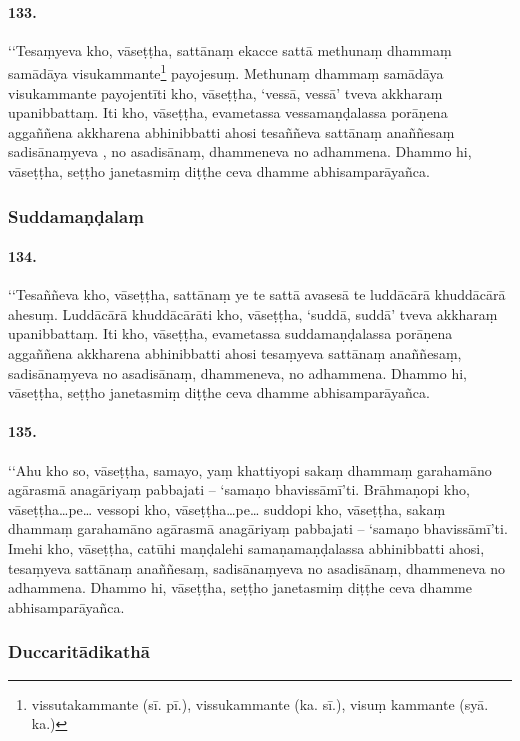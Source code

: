 \paragraph{133.} ‘‘Tesaṃyeva kho, vāseṭṭha, sattānaṃ ekacce sattā methunaṃ dhammaṃ samādāya visukammante\footnote{vissutakammante (sī. pī.), vissukammante (ka. sī.), visuṃ kammante (syā. ka.)} payojesuṃ. Methunaṃ dhammaṃ samādāya visukammante payojentīti kho, vāseṭṭha, ‘vessā, vessā’ tveva akkharaṃ upanibbattaṃ. Iti kho, vāseṭṭha, evametassa vessamaṇḍalassa porāṇena aggaññena akkharena abhinibbatti ahosi tesaññeva sattānaṃ anaññesaṃ sadisānaṃyeva , no asadisānaṃ, dhammeneva no adhammena. Dhammo hi, vāseṭṭha, seṭṭho janetasmiṃ diṭṭhe ceva dhamme abhisamparāyañca.

\subsubsection{Suddamaṇḍalaṃ}

\paragraph{134.} ‘‘Tesaññeva kho, vāseṭṭha, sattānaṃ ye te sattā avasesā te luddācārā khuddācārā ahesuṃ. Luddācārā khuddācārāti kho, vāseṭṭha, ‘suddā, suddā’ tveva akkharaṃ upanibbattaṃ. Iti kho, vāseṭṭha, evametassa suddamaṇḍalassa porāṇena aggaññena akkharena abhinibbatti ahosi tesaṃyeva sattānaṃ anaññesaṃ, sadisānaṃyeva no asadisānaṃ, dhammeneva, no adhammena. Dhammo hi, vāseṭṭha, seṭṭho janetasmiṃ diṭṭhe ceva dhamme abhisamparāyañca.

\paragraph{135.} ‘‘Ahu kho so, vāseṭṭha, samayo, yaṃ khattiyopi sakaṃ dhammaṃ garahamāno agārasmā anagāriyaṃ pabbajati – ‘samaṇo bhavissāmī’ti. Brāhmaṇopi kho, vāseṭṭha…pe… vessopi kho, vāseṭṭha…pe… suddopi kho, vāseṭṭha, sakaṃ dhammaṃ garahamāno agārasmā anagāriyaṃ pabbajati – ‘samaṇo bhavissāmī’ti. Imehi kho, vāseṭṭha, catūhi maṇḍalehi samaṇamaṇḍalassa abhinibbatti ahosi, tesaṃyeva sattānaṃ anaññesaṃ, sadisānaṃyeva no asadisānaṃ, dhammeneva no adhammena. Dhammo hi, vāseṭṭha, seṭṭho janetasmiṃ diṭṭhe ceva dhamme abhisamparāyañca.

\subsubsection{Duccaritādikathā}

